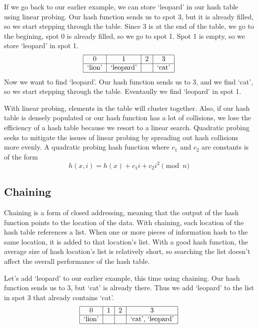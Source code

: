 If we go back to our earlier example, we can store `leopard' in our hash table using linear probing.
Our hash function sends us to spot 3, but it is already filled, so we start stepping through the table.
Since 3 is at the end of the table, we go to the begining, spot 0 is already filled, so we go to spot 1.
Spot 1 is empty, so we store `leopard' in spot 1.
\[
\begin{tabular}{|c|c|c|c|}
\hline
0 & 1 & 2 & 3\\
\hline
`lion' & `leopard' & & `cat' \\
\hline
\end{tabular}
\]
Now we want to find `leopard'.
Our hash function sends us to 3, and we find `cat', so we start stepping through the table.
Eventaully we find `leopard' in spot 1.


With linear probing, elements in the table will cluster together.
Also, if our hash table is densely populated or our hash function has a lot of collisions,
 we lose the efficiency of a hash table because we resort to a linear search.
Quadratic probing seeks to mitigate the issues of linear probing by spreading out hash collisions more evenly.
A quadratic probing hash function where $c_1$ and $c_2$ are constants is of the form
\begin{equation*}
h(x, i) = h(x) + c_1i + c_2i^2 \pmod{n}
\end{equation*}

\subsection*{Chaining}
Chaining is a form of closed addressing, meaning that the output of the hash function points to the location of the data.
With chaining, each location of the hash table references a list.
When one or more pieces of information hash to the same location, it is added to that location's list.
With a good hash function, the average size of hash location's list is relatively short,
so searching the list doesn't affect the overall performance of the hash table.

Let's add `leopard' to our earlier example, this time using chaining.
Our hash function sends us to 3, but `cat' is already there.
Thus we add `leopard' to the list in spot 3 that already contains `cat'.
\[
\begin{tabular}{|c|c|c|c|}
\hline
0 & 1 & 2 & 3\\
\hline
`lion' & & & `cat', `leopard' \\
\hline
\end{tabular}
\]


